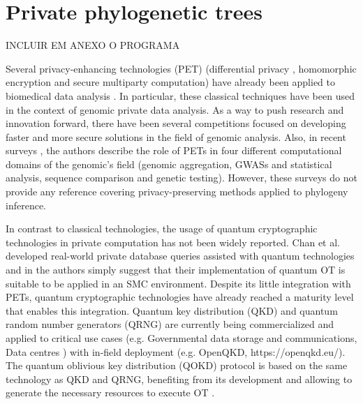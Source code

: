


%

\chapter{Private phylogenetic trees}

INCLUIR EM ANEXO O PROGRAMA

Several privacy-enhancing technologies (PET) (differential privacy \cite{Li2016}, homomorphic encryption \cite{Armknecht2015} and secure multiparty computation) have already been applied to biomedical data analysis \cite{Verhaert2018, Scardapane2017, Maulany2018, Kikuchi2018, Tawfik2018}. In particular, these classical techniques have been used in the context of genomic private data analysis. As a way to push research and innovation forward, there have been several competitions \cite{Wang2017} focused on developing faster and more secure solutions in the field of genomic analysis. Also, in recent surveys \cite{MY19, Naveed2015}, the authors describe the role of PETs in four different computational domains of the genomic's field (genomic aggregation, GWASs and statistical analysis, sequence comparison and genetic testing). However, these surveys do not provide any reference covering privacy-preserving methods applied to phylogeny inference. 

In contrast to classical technologies, the usage of quantum cryptographic technologies in private computation has not been widely reported. Chan et al. \cite{Chan2014} developed real-world private database queries assisted with quantum technologies and in \cite{Ito2017} the authors simply suggest that their implementation of quantum OT is suitable to be applied in an SMC environment. %
Despite its little integration with PETs, quantum cryptographic technologies have already reached a maturity level that enables this integration. Quantum key distribution (QKD) and quantum random number generators (QRNG) are currently being commercialized and applied to critical use cases (e.g. Governmental data storage and communications, Data centres \cite{AM19}) with in-field deployment (e.g. OpenQKD, https://openqkd.eu/). The quantum oblivious key distribution (QOKD) protocol is based on the same technology as QKD and QRNG, benefiting from its development and allowing to generate the necessary resources to execute OT \cite{Lemus20, JSGBBWZ11, KWW12}. 

